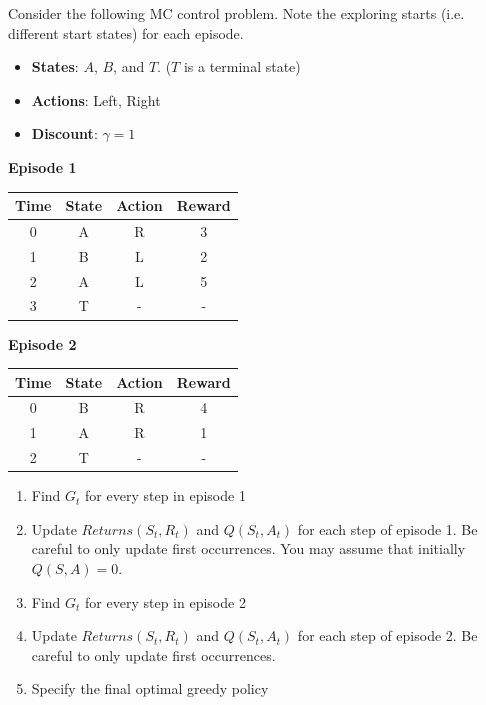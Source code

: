 \begin{exerciseboxpaper}
Consider the following MC control problem. Note the exploring starts (i.e. different start states) for each episode. 

\begin{itemize}
    \item {\bf States}: $A$, $B$, and $T$. ($T$ is a terminal state)
    \item {\bf Actions}: Left, Right
    \item {\bf Discount}: $\gamma=1$
\end{itemize}

\vspace{0.5\baselineskip}

\textbf{Episode 1}

\vspace{0.5\baselineskip}
    
\renewcommand{\arraystretch}{1.25}
\begin{tabular}{c|c|c|c}
{\bf Time} & {\bf State} & {\bf Action} & {\bf Reward} \\ \hline
0 & A & R & 3 \\
1 & B & L & 2 \\
2 & A & L & 5 \\
3 & T & - & - \\
\end{tabular}

\vspace{0.5\baselineskip}

\textbf{Episode 2}

\vspace{0.5\baselineskip}

\renewcommand{\arraystretch}{1.25}
\begin{tabular}{c|c|c|c}
{\bf Time} & {\bf State} & {\bf Action} & {\bf Reward} \\ \hline
0 & B & R & 4 \\
1 & A & R & 1 \\
2 & T & - & - \\
\end{tabular}

\vspace{0.5\baselineskip}
    
\begin{enumerate}
   \item Find $G_t$ for every step in episode 1
   \item Update $Returns(S_t, R_t)$ and $Q(S_t, A_t)$ for each step of episode 1. Be careful to only update first occurrences. You may assume that initially $Q(S, A)=0$.
   \item Find $G_t$ for every step in episode 2
   \item Update $Returns(S_t, R_t)$ and $Q(S_t, A_t)$ for each step of episode 2. Be careful to only update first occurrences.
   \item Specify the final optimal greedy policy
\end{enumerate}
\end{exerciseboxpaper}

